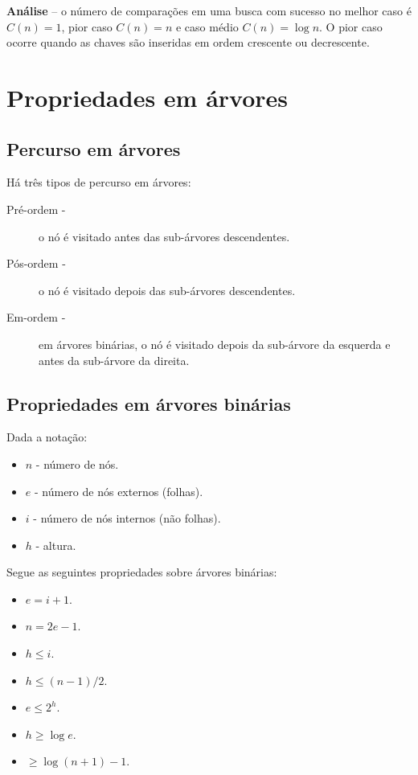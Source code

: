 {\bf Análise} -- o número de comparações em uma busca com sucesso no melhor caso é 
$C(n)= 1$, pior caso $C(n) = n$ e caso médio $C(n) = \log  n$.
O pior caso ocorre quando as chaves são inseridas em ordem crescente ou decrescente.

\section{Propriedades em árvores}

\subsection{Percurso em árvores}

Há três tipos de percurso em árvores:
\begin{description}
\item[Pré-ordem -] o nó é visitado antes das sub-árvores descendentes. 
\item[Pós-ordem -] o nó é visitado depois das sub-árvores descendentes.
\item[Em-ordem -] em árvores binárias, o nó é visitado depois da sub-árvore
da esquerda e antes da sub-árvore da direita.
\end{description}

\subsection{Propriedades em árvores binárias}

Dada a notação:
\begin{itemize}
\item $n$ - número de nós.
\item $e$ - número de nós externos (folhas).
\item $i$ - número de nós internos (não folhas).
\item $h$ - altura.
\end{itemize}
Segue as seguintes propriedades sobre árvores binárias:
\begin{itemize}
\item $e = i + 1$.
\item $n = 2e - 1$.
\item $h \leq i$.
\item $h \leq (n-1)/2$.
\item $e \leq 2^h$.
\item $h \geq \log e$.
\item $ \geq \log (n+1) -1$.
\end{itemize}



